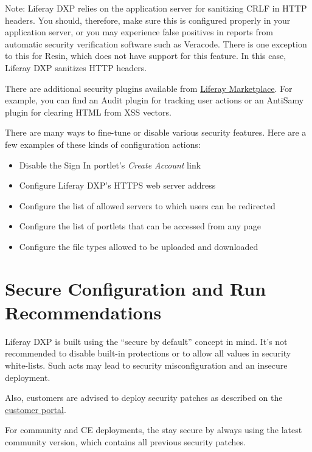\noindent\hrulefill

Note: Liferay DXP relies on the application server for sanitizing CRLF
in HTTP headers. You should, therefore, make sure this is configured
properly in your application server, or you may experience false
positives in reports from automatic security verification software such
as Veracode. There is one exception to this for Resin, which does not
have support for this feature. In this case, Liferay DXP sanitizes HTTP
headers.

\noindent\hrulefill

There are additional security plugins available from
\href{https://www.liferay.com/marketplace}{Liferay Marketplace}. For
example, you can find an Audit plugin for tracking user actions or an
AntiSamy plugin for clearing HTML from XSS vectors.

There are many ways to fine-tune or disable various security features.
Here are a few examples of these kinds of configuration actions:

\begin{itemize}
\tightlist
\item
  Disable the Sign In portlet's \emph{Create Account} link
\item
  Configure Liferay DXP's HTTPS web server address
\item
  Configure the list of allowed servers to which users can be redirected
\item
  Configure the list of portlets that can be accessed from any page
\item
  Configure the file types allowed to be uploaded and downloaded
\end{itemize}

\section{Secure Configuration and Run
Recommendations}\label{secure-configuration-and-run-recommendations}

Liferay DXP is built using the ``secure by default'' concept in mind.
It's not recommended to disable built-in protections or to allow all
values in security white-lists. Such acts may lead to security
misconfiguration and an insecure deployment.

Also, customers are advised to deploy security patches as described on
the
\href{https://www.liferay.com/group/customer/products/portal/security-vulnerability}{customer
portal}.

For community and CE deployments, the stay secure by always using the
latest community version, which contains all previous security patches.

